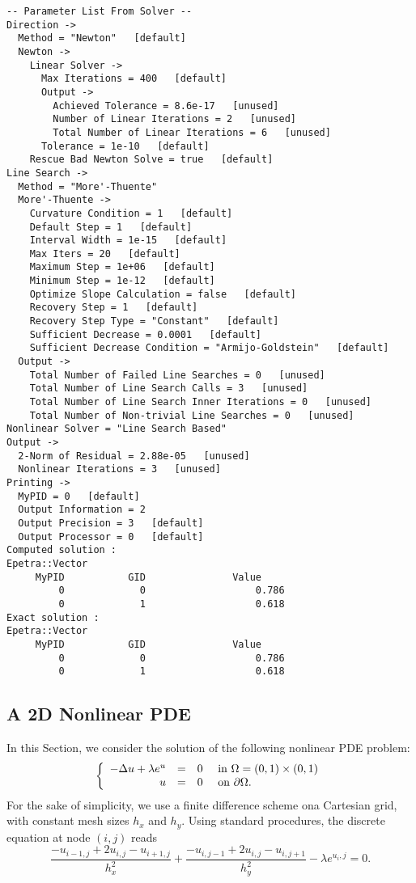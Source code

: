 \begin{verbatim}
-- Parameter List From Solver --
Direction ->
  Method = "Newton"   [default]
  Newton ->
    Linear Solver ->
      Max Iterations = 400   [default]
      Output ->
        Achieved Tolerance = 8.6e-17   [unused]
        Number of Linear Iterations = 2   [unused]
        Total Number of Linear Iterations = 6   [unused]
      Tolerance = 1e-10   [default]
    Rescue Bad Newton Solve = true   [default]
Line Search ->
  Method = "More'-Thuente"
  More'-Thuente ->
    Curvature Condition = 1   [default]
    Default Step = 1   [default]
    Interval Width = 1e-15   [default]
    Max Iters = 20   [default]
    Maximum Step = 1e+06   [default]
    Minimum Step = 1e-12   [default]
    Optimize Slope Calculation = false   [default]
    Recovery Step = 1   [default]
    Recovery Step Type = "Constant"   [default]
    Sufficient Decrease = 0.0001   [default]
    Sufficient Decrease Condition = "Armijo-Goldstein"   [default]
  Output ->
    Total Number of Failed Line Searches = 0   [unused]
    Total Number of Line Search Calls = 3   [unused]
    Total Number of Line Search Inner Iterations = 0   [unused]
    Total Number of Non-trivial Line Searches = 0   [unused]
Nonlinear Solver = "Line Search Based"
Output ->
  2-Norm of Residual = 2.88e-05   [unused]
  Nonlinear Iterations = 3   [unused]
Printing ->
  MyPID = 0   [default]
  Output Information = 2
  Output Precision = 3   [default]
  Output Processor = 0   [default]
Computed solution :
Epetra::Vector
     MyPID           GID               Value
         0             0                   0.786
         0             1                   0.618
Exact solution :
Epetra::Vector
     MyPID           GID               Value
         0             0                   0.786
         0             1                   0.618
\end{verbatim}


\subsection{A 2D Nonlinear PDE}
\label{sec:nox_2d}

In this Section, we consider the solution of the following nonlinear PDE
problem:
\begin{equation}
  \label{eq:nox_nonlinear_2d}
  \left\{
    \begin{array}{r c l l }
      - \Delta u + \lambda e^u & = & 0 & \mbox{ in } \Omega = (0,1)
      \times (0,1) \\
      u & = & 0 & \mbox{ on } \partial \Omega .
    \end{array}
  \right.   
\end{equation}
For the sake of simplicity, we use a finite difference scheme ona
Cartesian grid, with constant mesh sizes $h_x$ and $h_y$. Using standard
procedures, the discrete equation at node $(i,j)$ reads
\[
\frac{ - u_{i-1,j} + 2 u_{i,j} - u_{i+1,j} }{ h_x^2} +
\frac{ - u_{i,j-1} + 2 u_{i,j} - u_{i,j+1} }{ h_y^2}  -
\lambda e^{u{_i,j}} = 0 .
\]

